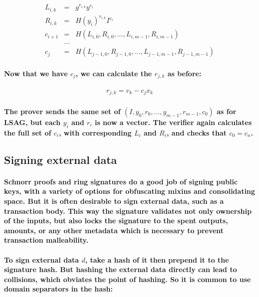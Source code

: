 \documentclass{article}
\begin{document}
\begin{eqnarray}
  L_{i,k} &=& g^{r_{i,k}} y^{c_i}\\
  R_{i,k} &=& H(y_i)^{r_{i,k}} I^{c_i}\\
  c_{i+1} &=& H(L_{i,0}, R_{i,0}, ..., L_{i,m-1}, R_{i,m-1}) \\
  &...& \\
  c_j &=& H(L_{j-1,0}, R_{j-1,0}, ..., L_{j-1,m-1}, R_{j-1,m-1}) 
\end{eqnarray}

\paragraph{Now that we have $c_j$, we can calculate the $r_{j,k}$ as before:}

\begin{eqnarray}
  r_{j,k} = v_k - c_j x_k
\end{eqnarray}

\paragraph{The prover sends the same set of $(I, y_0, r_0, ..., y_{m-1}, r_{m-1}, c_0)$ as for LSAG, but each $y_i$ and $r_i$ is now a vector.  The verifier again calculates the full set of $c_i$, with corresponding $L_i$ and $R_i$, and checks that $c_0 = c_n$.}


\subsection{Signing external data}

\paragraph{Schnorr proofs and ring signatures do a good job of signing public keys, with a variety of options for obfuscating mixins and consolidating space.  But it is often desirable to sign external data, such as a transaction body.  This way the signature validates not only ownership of the inputs, but also locks the signature to the spent outputs, amounts, or any other metadata which is necessary to prevent transaction malleability.}

\paragraph{To sign external data $d$, take a hash of it then prepend it to the signature hash.  But hashing the external data directly can lead to collisions, which obviates the point of hashing.  So it is common to use domain separators in the hash:}
\end{document}
